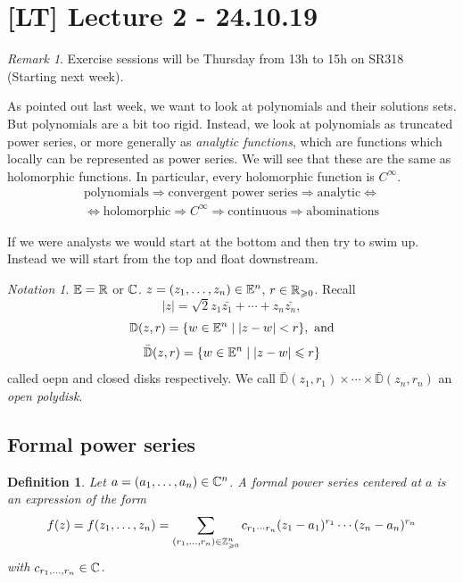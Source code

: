 \documentclass[A4paper, british, reqno]{amsart}
\theoremstyle{darkgreentheorem}
\theoremstyle{darkbluedefinition}
\newtheorem{defn}[thm]{Definition}
\theoremstyle{darkredexample}
\theoremstyle{remark}
\newtheorem{rem}[thm]{Remark}
\newtheorem{nota}[thm]{Notation}
\newcommand{\cbbD}{\bar{\mathbb{D}}}
\newcommand{\1}{\mathbbm{1}}
\begin{document}
\section{[LT] Lecture 2 - 24.10.19}

\begin{rem}
    Exercise sessions will be Thursday from 13h to 15h on SR318 (Starting next week).
\end{rem}

As pointed out last week, we want to look at polynomials and their solutions sets.
But polynomials are a bit too rigid.
Instead, we look at polynomials as truncated power series, or more generally as \textit{analytic functions}, which are functions which locally can be represented as power series.
We will see that these are the same as holomorphic functions.
In particular, every holomorphic function is $C^{\infty}$.
\begin{multline*}
    \text{polynomials} \Rightarrow \text{convergent power series} \Rightarrow \text{analytic} \Leftrightarrow \\
    \Leftrightarrow \text{holomorphic} \Rightarrow C^{\infty}\Rightarrow \text{continuous} \Rightarrow \text{abominations}
\end{multline*}

If we were analysts we would start at the bottom and then try to swim up.
Instead we will start from the top and float downstream.

\begin{nota}
    $\mathbb{E}=\mathbb{R}$ or $\mathbb{C}$.
    $z=(z_{1},\ldots,z_{n})\in \mathbb{E}^{n}$, $r\in \mathbb{R}_{\geqslant 0}$.
    Recall
    \[ |z|=\sqrt{2}{z_{1}\bar{z_{1}}+\cdots + z_{n}\bar{z_{n}}}, \]
    \[ \mathbb{D}(z,r)=\{w\in \mathbb{E}^{n}\mid |z-w|<r\}, \text{ and} \]
    \[ \cbbD(z,r)=\{ w\in \bbE^{n}\mid |z-w|\leqslant r\} \]
    called oepn and closed disks respectively.
    We call $\cbbD(z_{1},r_{1})\times \cdots \times \cbbD(z_{n},r_{n})$ an \textit{open polydisk}.
\end{nota}

\subsection{Formal power series}

\begin{defn}
    Let $a=(a_{1},\ldots,a_{n})\in \mathbb{C}^{n}$.
    A \textit{formal power series} centered at $a$ is an expression of the form
    \[ f(z)=f(z_{1},\ldots,z_{n})=\sum_{(r_{1},\ldots, r_{n})\in \mathbb{Z}^{n}_{\geqslant 0}}c_{r_{1}\cdots r_{n}}(z_{1}-a_{1})^{r_{1}}\cdots (z_{n}-a_{n})^{r_{n}} \]
    with $c_{r_{1},\ldots,r_{n}}\in \mathbb{C}$.
\end{defn}
\end{document}
